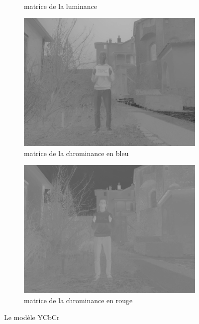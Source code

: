 \documentclass{article}
\begin{document}
\begin{figure}[htbp]
\begin{subfigure}[b]{0.24\textwidth}
        \caption{\\ matrice de la luminance}
    \end{subfigure}
    \hfill
    \begin{subfigure}[b]{0.24\textwidth}
        \includegraphics[width=\textwidth]{transformation_couleur/chrominance_bleu.png}
        \caption{\centering matrice de la chrominance en bleu}
    \end{subfigure}
    \hfill
    \begin{subfigure}[b]{0.24\textwidth}
        \includegraphics[width=\textwidth]{transformation_couleur/chrominance_rouge.png}
        \caption{\centering matrice de la chrominance en rouge}
    \end{subfigure}
    \caption{Le modèle YCbCr}
\end{figure}
\end{document}
